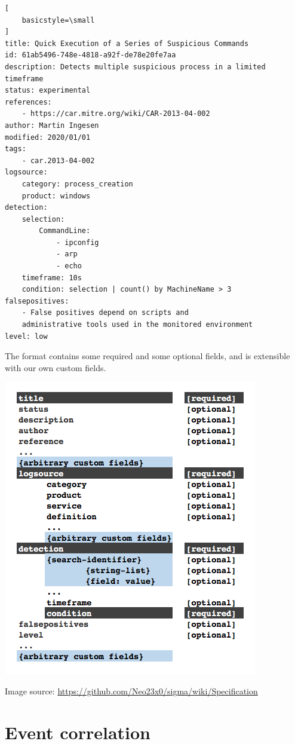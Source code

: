 \begin{lstlisting}[
    basicstyle=\small
]
title: Quick Execution of a Series of Suspicious Commands
id: 61ab5496-748e-4818-a92f-de78e20fe7aa
description: Detects multiple suspicious process in a limited timeframe
status: experimental
references:
    - https://car.mitre.org/wiki/CAR-2013-04-002
author: Martin Ingesen
modified: 2020/01/01
tags:
    - car.2013-04-002
logsource:
    category: process_creation
    product: windows
detection:
    selection:
        CommandLine:
            - ipconfig
            - arp
            - echo
    timeframe: 10s
    condition: selection | count() by MachineName > 3
falsepositives:
    - False positives depend on scripts and
    administrative tools used in the monitored environment
level: low
\end{lstlisting}
The format contains some required and some optional fields, and is extensible with our own custom fields.

\includegraphics[scale=0.525]{figures/new-rule-format/Sigma_Schema.png}

Image source: \url{https://github.com/Neo23x0/sigma/wiki/Specification}

\section{Event correlation}

